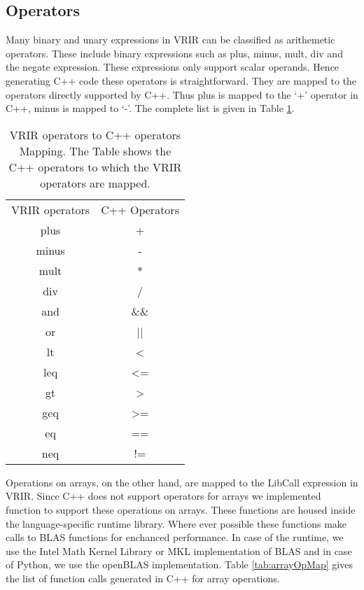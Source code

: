 \subsection{Operators}
\label{subsec:operators}
Many binary and unary expressions in VRIR can be classified as arithemetic operators. These include binary expressions such as  plus, minus, mult, div and the negate expression. These expressions  only support scalar operands. Hence generating C++ code these operators is straightforward. They are mapped to the operators directly supported by C++. Thus plus is mapped to the `+' operator in C++, minus is mapped to `-'. The complete list is given in Table \ref{tab:opMap}. \\
			\begin{table}[htbp]
					\centering
					\begin{tabular}{|c|c|}
					\hline
					VRIR operators & C++ Operators \\ \hhline{|=|=|}
					plus           & +             \\ \hline
					minus          & -             \\ \hline
					mult           & *             \\ \hline
					div            & /             \\ \hline
					and            & \&\&           \\ \hline
					or             & ||            \\ \hline
					lt             & \textless     \\ \hline
					leq            & \textless=    \\ \hline
					gt             & \textgreater  \\ \hline
					geq            & \textgreater= \\ \hline
					eq             & ==            \\ \hline
					neq            & !=            \\ \hline
					\end{tabular}
					\caption[List of operators in VRIR and C++]{VRIR operators to C++ operators Mapping. The Table shows the C++ operators to which the VRIR operators are mapped.}
					\label{tab:opMap}
					\end{table}
Operations on arrays, on the other hand, are mapped to the LibCall expression in VRIR. Since C++ does not support operators for arrays we implemented function to support these operations on arrays. These functions are housed inside the language-specific runtime library. Where ever possible these functions make calls to BLAS functions for enchanced performance. In case of the \matlab runtime, we use the Intel Math Kernel Library\cite{mkl} or MKL implementation of BLAS and in case of Python, we use the openBLAS\cite{openblas} implementation. Table \ref{tab:arrayOpMap} gives the list of function calls generated in C++ for array operations. 
